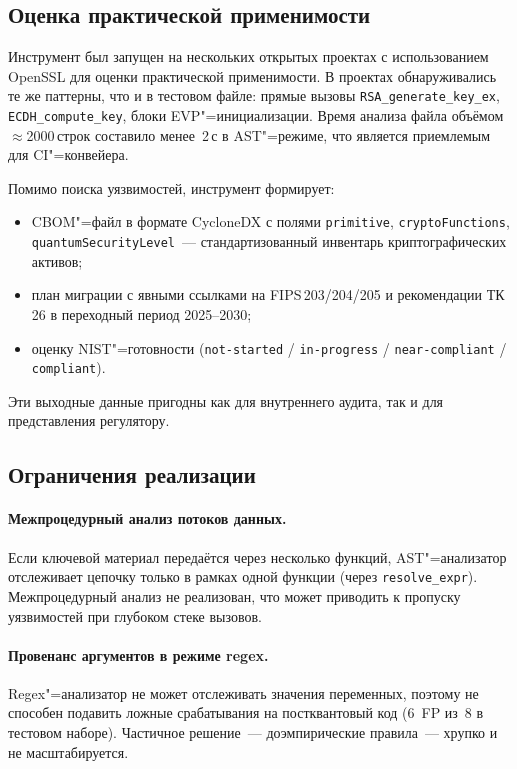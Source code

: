 \subsection{Оценка практической применимости}

Инструмент был запущен на нескольких открытых проектах с использованием
OpenSSL для оценки практической применимости.
В проектах обнаруживались те же паттерны, что и в тестовом файле:
прямые вызовы \texttt{RSA\_generate\_key\_ex}, \texttt{ECDH\_compute\_key},
блоки EVP"=инициализации.
Время анализа файла объёмом~$\approx$2000\,строк составило
менее~2\,с в AST"=режиме, что является приемлемым для CI"=конвейера.

Помимо поиска уязвимостей, инструмент формирует:
\begin{itemize}
  \item CBOM"=файл в формате CycloneDX с полями \texttt{primitive},
        \texttt{cryptoFunctions}, \texttt{quantumSecurityLevel}~---
        стандартизованный инвентарь криптографических активов;
  \item план миграции с явными ссылками на FIPS\,203/204/205 и
        рекомендации ТК\,26 в переходный период 2025--2030;
  \item оценку NIST"=готовности (\texttt{not-started} / \texttt{in-progress} /
        \texttt{near-compliant} / \texttt{compliant}).
\end{itemize}
Эти выходные данные пригодны как для внутреннего аудита, так и для
представления регулятору.

\subsection{Ограничения реализации}

\paragraph{Межпроцедурный анализ потоков данных.}
Если ключевой материал передаётся через несколько функций, AST"=анализатор
отслеживает цепочку только в рамках одной функции (через
\texttt{resolve\_expr}). Межпроцедурный анализ не реализован, что может
приводить к пропуску уязвимостей при глубоком стеке вызовов.

\paragraph{Провенанс аргументов в режиме regex.}
Regex"=анализатор не может отслеживать значения переменных, поэтому
не способен подавить ложные срабатывания на постквантовый код
(6~FP из~8 в тестовом наборе). Частичное решение~--- доэмпирические
правила~--- хрупко и не масштабируется.


